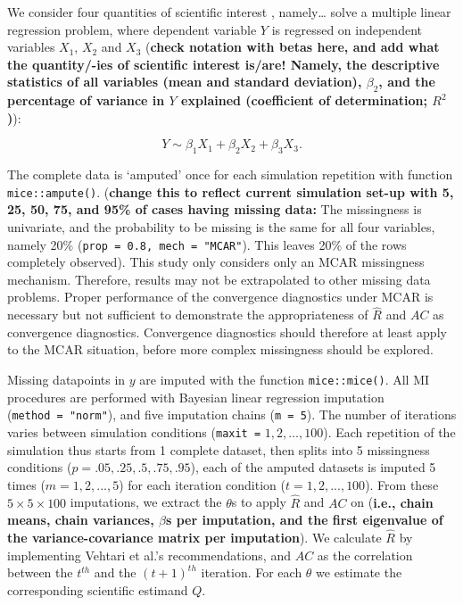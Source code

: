 \documentclass[Royal,times,sageh]{sagej}
\begin{document}
We consider four quantities of scientific interest \citep[`conceptual
estimands';][]{morr19}, namely\ldots{} solve a multiple linear
regression problem, where dependent variable \(Y\) is regressed on
independent variables \(X_1\), \(X_2\) and \(X_3\) (\textbf{check
notation with betas here, and add what the quantity/-ies of scientific
interest is/are! Namely, the descriptive statistics of all variables
(mean and standard deviation), \(\beta_2\), and the percentage of
variance in \(Y\) explained (coefficient of determination; \(R^2\))}):

\[Y \sim \beta_1 X_1 + \beta_2 X_2 + \beta_3 X_3.\]

The complete data is `amputed' once for each simulation repetition with
function \texttt{mice::ampute()}. (\textbf{change this to reflect
current simulation set-up with 5, 25, 50, 75, and 95\% of cases having
missing data:} The missingness is univariate, and the probability to be
missing is the same for all four variables, namely 20\%
(\texttt{prop\ =\ 0.8,\ mech\ =\ "MCAR"}). This leaves 20\% of the rows
completely observed). This study only considers only an MCAR missingness
mechanism. Therefore, results may not be extrapolated to other missing
data problems. Proper performance of the convergence diagnostics under
MCAR is necessary but not sufficient to demonstrate the appropriateness
of \(\widehat{R}\) and \(AC\) as convergence diagnostics. Convergence
diagnostics should therefore at least apply to the MCAR situation,
before more complex missingness should be explored.

Missing datapoints in \(y\) are imputed with the function
\texttt{mice::mice()}. All MI procedures are performed with Bayesian
linear regression imputation (\texttt{method\ =\ "norm"}), and five
imputation chains (\texttt{m\ =\ 5}). The number of iterations varies
between simulation conditions (\texttt{maxit\ =} \(1, 2, \dots, 100\)).
Each repetition of the simulation thus starts from 1 complete dataset,
then splits into 5 missingness conditions (\(p =.05,.25,.5,.75,.95\)),
each of the amputed datasets is imputed 5 times (\(m = 1, 2,..., 5\))
for each iteration condition (\(t = 1, 2,..., 100\)). From these
\(5\times5\times100\) imputations, we extract the \(\theta\)s to apply
\(\widehat{R}\) and \(AC\) on (\textbf{i.e., chain means, chain
variances, \(\beta\)s per imputation, and the first eigenvalue of the
variance-covariance matrix per imputation}). We calculate
\(\widehat{R}\) by implementing Vehtari et al.'s \citeyearpar{veht19}
recommendations, and \(AC\) as the correlation between the \(t^{th}\)
and the \((t+1)^{th}\) iteration. For each \(\theta\) we estimate the
corresponding scientific estimand \(Q\).
\end{document}
